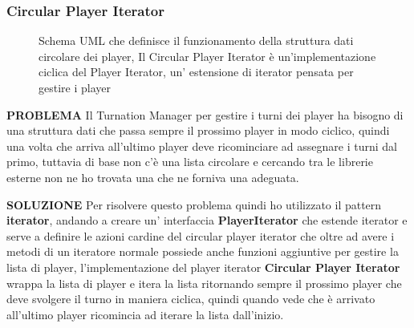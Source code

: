 \subsubsection{Circular Player Iterator}
\begin{figure}[H]
    \centering
    \caption{Schema UML che definisce il funzionamento della struttura dati circolare dei player, Il Circular Player Iterator è un'implementazione ciclica del Player Iterator,
    un' estensione di iterator pensata per gestire i player}
	\label{img:Iterator}
\end{figure}

\textbf{PROBLEMA}\newline
Il Turnation Manager per gestire i turni dei player ha bisogno di una struttura dati che passa sempre il prossimo player in modo ciclico, 
quindi una volta che arriva all'ultimo player deve ricominciare ad assegnare i turni dal primo, tuttavia di base non c'è una lista circolare 
e cercando tra le librerie esterne non ne ho trovata una che ne forniva una adeguata.\newline

\textbf{SOLUZIONE}\newline
Per risolvere questo problema quindi ho utilizzato il pattern \textbf{iterator}, andando a creare un' interfaccia \textbf{PlayerIterator} che estende iterator 
e serve a definire le azioni cardine del circular player iterator che oltre ad avere i metodi di un iteratore normale possiede anche funzioni aggiuntive per gestire la lista di player,
l'implementazione del player iterator \textbf{Circular Player Iterator} wrappa la lista di player e itera la lista ritornando sempre il prossimo player 
che deve svolgere il turno in maniera ciclica, quindi quando vede che è arrivato all'ultimo player ricomincia ad iterare la lista dall'inizio.\newline

